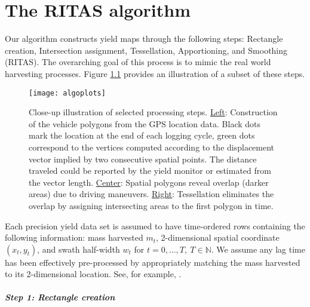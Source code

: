 \chapter{The RITAS algorithm}
\label{sec:ritas}

Our algorithm constructs yield maps through the following steps:
Rectangle creation, Intersection assignment, Tessellation,
Apportioning, and Smoothing (RITAS). The overarching goal of this
process is to mimic the real world harvesting processes. Figure
\ref{fig:closeup} provides an illustration of a subset of these steps.

\begin{figure}[h!]  \centering
  \texttt{[image: algoplots]}
  \caption[Close-up illustration of selected algorithm steps]{Close-up
    illustration of selected processing steps. \underline{Left}:
    Construction of the vehicle polygons from the GPS location
    data. Black dots mark the location at the end of each logging
    cycle, green dots correspond to the vertices computed according to
    the displacement vector implied by two consecutive spatial
    points. The distance traveled could be reported by the yield
    monitor or estimated from the vector length. \underline{Center}:
    Spatial polygons reveal overlap (darker areas) due to driving
    maneuvers. \underline{Right}: Tessellation eliminates the overlap
    by assigning intersecting areas to the first polygon in time.}
    \label{fig:closeup}
\end{figure}

Each precision yield data set is assumed to have time-ordered rows
containing the following information: mass harvested $m_t$,
2-dimensional spatial coordinate $(x_t,y_t)$, and swath half-width
$w_t$ for $t=0,\ldots,T, \ T \in \mathbb{N}$.  We assume any lag time
has been effectively pre-processed by appropriately matching the mass
harvested to its 2-dimensional location. See, for example,
\cite{Burks2004, Hemming2005, Sudduth2007, Sudduth2012}.

\paragraph*{Step 1: Rectangle creation}

